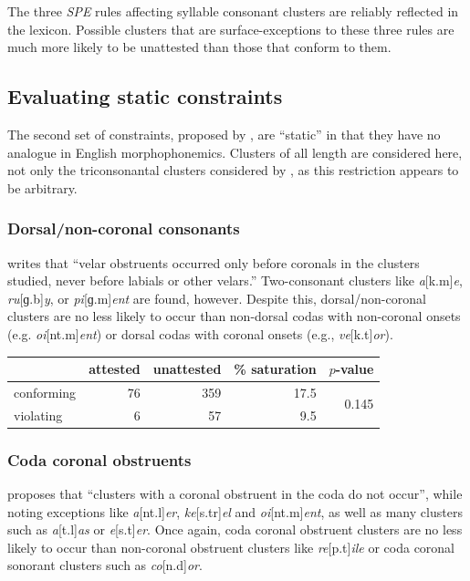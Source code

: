 The three \emph{SPE} rules affecting syllable consonant clusters are reliably reflected in the lexicon. Possible clusters that are surface-exceptions to these three rules are much more likely to be unattested than those that conform to them.

\subsection{Evaluating static constraints}

The second set of constraints, proposed by \citet{Pierrehumbert1994}, are ``static'' in that they have no analogue in English morphophonemics. Clusters of all length are considered here, not only the triconsonantal clusters considered by \citeauthor{Pierrehumbert1994}, as this restriction appears to be arbitrary.

\subsubsection{Dorsal/non-coronal consonants}

\citet[173]{Pierrehumbert1994} writes that ``velar obstruents occurred only before coronals in the clusters studied, never before labials or other velars.'' Two-consonant clusters like \emph{a}[k.m]\emph{e}, \emph{ru}[ɡ.b]\emph{y}, or \emph{pi}[ɡ.m]\emph{ent} are found, however. Despite this, dorsal/non-coronal clusters are no less likely to occur than non-dorsal codas with non-coronal onsets (e.g. \emph{oi}[nt.m]\emph{ent}) or dorsal codas with coronal onsets (e.g., \emph{ve}[k.t]\emph{or}).

\begin{example}
\begin{tabular}{l r r r r}
\toprule
           & attested & unattested & \% saturation & $p$-value \\
\midrule
conforming & 76 & 359 & 17.5 & \multirow{2}{*}{0.145} \\
violating  &  6 &  57 & 9.5 \\
\bottomrule
\end{tabular}
\end{example}

\subsubsection{Coda coronal obstruents}

\citet[175]{Pierrehumbert1994} proposes that ``clusters with a coronal obstruent in the coda do not occur'', while noting exceptions like \emph{a}[nt.l]\emph{er}, \emph{ke}[s.tr]\emph{el} and \emph{oi}[nt.m]\emph{ent}, as well as many clusters such as \emph{a}[t.l]\emph{as} or \emph{e}[s.t]\emph{er}. Once again, coda coronal obstruent clusters are no less likely to occur than non-coronal obstruent clusters like \emph{re}[p.t]\emph{ile} or coda coronal sonorant clusters such as \emph{co}[n.d]\emph{or}.

